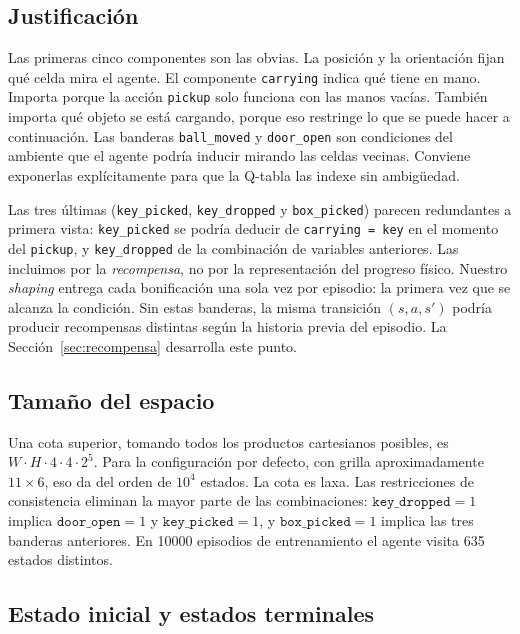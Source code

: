 \documentclass[11pt,a4paper]{article}
\begin{document}
\subsection{Justificación}

Las primeras cinco componentes son las obvias. La posición y la orientación
fijan qué celda mira el agente. El componente \texttt{carrying} indica qué
tiene en mano. Importa porque la acción \texttt{pickup} solo funciona con las
manos vacías. También importa qué objeto se está cargando, porque eso
restringe lo que se puede hacer a continuación. Las banderas
\texttt{ball\_moved} y \texttt{door\_open} son condiciones del ambiente que
el agente podría inducir mirando las celdas vecinas. Conviene exponerlas
explícitamente para que la Q-tabla las indexe sin ambigüedad.

Las tres últimas (\texttt{key\_picked}, \texttt{key\_dropped} y
\texttt{box\_picked}) parecen redundantes a primera vista:
\texttt{key\_picked} se podría deducir de \texttt{carrying = key} en el
momento del \texttt{pickup}, y \texttt{key\_dropped} de la combinación de
variables anteriores. Las incluimos por la \emph{recompensa}, no por la
representación del progreso físico. Nuestro \emph{shaping} entrega cada
bonificación una sola vez por episodio: la primera vez que se alcanza la
condición. Sin estas banderas, la misma transición \((s, a, s')\) podría
producir recompensas distintas según la historia previa del episodio. La
Sección~\ref{sec:recompensa} desarrolla este punto.

\subsection{Tamaño del espacio}

Una cota superior, tomando todos los productos cartesianos posibles, es
\(W \cdot H \cdot 4 \cdot 4 \cdot 2^5\). Para la configuración por defecto,
con grilla aproximadamente \(11\times 6\), eso da del orden de \(10^4\)
estados. La cota es laxa. Las restricciones de consistencia eliminan la
mayor parte de las combinaciones: \(\texttt{key\_dropped}=1\) implica
\(\texttt{door\_open}=1\) y \(\texttt{key\_picked}=1\), y
\(\texttt{box\_picked}=1\) implica las tres banderas anteriores. En
\num{10000} episodios de entrenamiento el agente visita \num{635} estados
distintos.

\subsection{Estado inicial y estados terminales}
\end{document}
